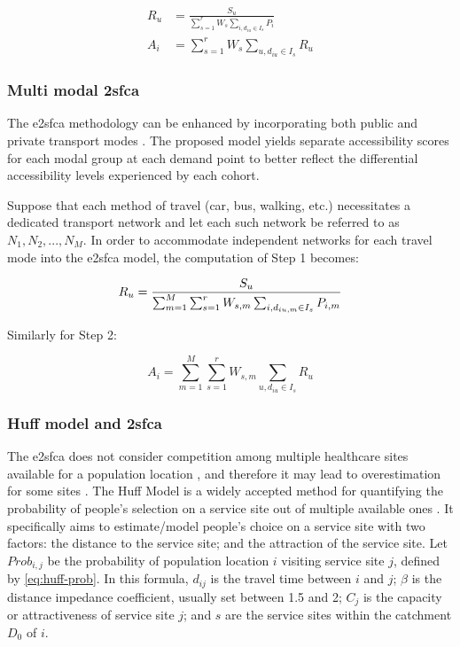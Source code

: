 \begin{align}
    R_u & =  \frac{S_u}{\sum_{s=1}^{r} W_s \sum_{i, d_{iu} \in I_s} P_i} \\
    A_i & = \sum_{s=1}^{r} W_s \sum_{u, d_{iu} \in I_s} R_u
\end{align}

\subsubsection{Multi modal \acl{2sfca}}

The \ac{e2sfca} methodology can be enhanced by incorporating both public and
private transport modes \cite{langford_multi-modal_2016}. The proposed model
yields separate accessibility scores for each modal group at each demand point
to better reflect the differential accessibility levels experienced by each
cohort.

Suppose that each method of travel (car, bus, walking, etc.) necessitates a
dedicated transport network and let each such network be referred to as $N_1,
    N_2, ..., N_M$. In order to accommodate independent networks for each travel
mode into the \ac{e2sfca} model, the computation of Step 1 becomes:

\begin{equation}
    R_u =  \frac{S_u}{\sum_{m=1}^{M} \sum_{s=1}^{r} W_{s,m} \sum_{i, d_{iu,m} \in I_s} P_{i,m}} \\
\end{equation}

Similarly for Step 2:

\begin{equation}
    A_i = \sum_{m=1}^{M} \sum_{s=1}^{r} W_{s, m} \sum_{u, d_{iu} \in I_s} R_u
\end{equation}

\subsubsection{Huff model and \acl{2sfca}}

The \ac{e2sfca} does not consider competition among multiple healthcare sites
available for a population location \cite{wan_three-step_2012}, and therefore it
may lead to overestimation for some sites \cite{luo_integrating_2014}. The Huff
Model is a widely accepted method for quantifying the probability of people's
selection on a service site out of multiple available ones
\cite{huff_probabilistic_1963}. It specifically aims to estimate/model people's
choice on a service site with two factors: the distance to the service site; and
the attraction of the service site. Let $Prob_{i,j}$ be the probability of
population location $i$ visiting service site $j$, defined by
\cref{eq:huff-prob}. In this formula, $d_{ij}$ is the travel time between $i$
and $j$; $\beta$ is the distance impedance coefficient, usually set between 1.5
and 2; $C_j$ is the capacity or attractiveness of service site $j$; and $s$ are
the service sites within the catchment $D_0$ of $i$.

